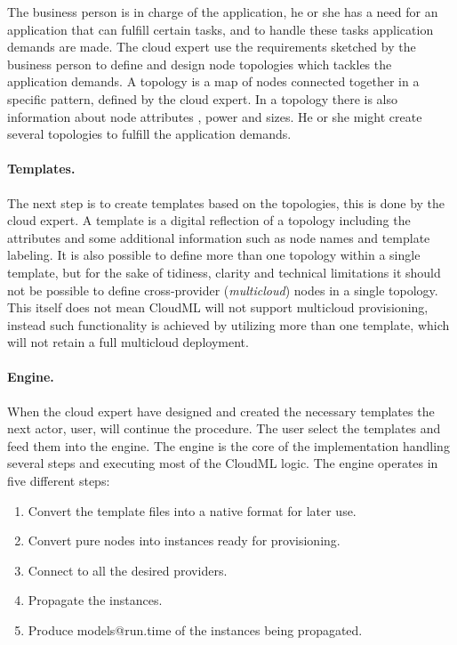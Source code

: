 The business person is in charge of the application, he or she has a need
for an application that can fulfill certain tasks, and to handle these 
tasks application demands are made.
The cloud expert use the requirements sketched by the business person to 
define and design node topologies which tackles the application demands.
A topology is a map of nodes connected together in a specific pattern, 
defined by the cloud expert.
In a topology there is also information about node attributes 
\eg,  power and  sizes.
He or she might create several topologies to fulfill the application demands.

\paragraph{Templates.}

The next step is to create templates based on the topologies, this is done by
the cloud expert.
A template is a digital reflection of a topology including the attributes and some additional 
information such as node names and template labeling.
It is also possible to define more than one topology within a single template,
but for the sake of tidiness, clarity and technical limitations it 
should not be possible to define cross-provider (\emph{multicloud}) nodes in a single topology.
This itself does not mean CloudML will not support multicloud provisioning,
instead such functionality is achieved by utilizing more than one template,
which will not retain a full multicloud deployment.

\paragraph{Engine.}

When the cloud expert have designed and created the necessary templates the next actor, 
user, will continue the procedure.
The user select the templates and feed them into the engine.
The engine is the core of the implementation handling several steps and executing
most of the CloudML logic.
The engine operates in five different steps:
\begin{enumerate}
  \item Convert the template files into a native format for later use.
  \item Convert pure nodes into instances ready for provisioning.
  \item Connect to all the desired providers.
  \item Propagate the instances.
  \item Produce models@run.time of the instances being propagated.
\end{enumerate}

